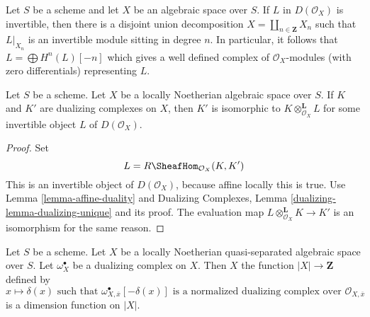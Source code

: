 \medskip\noindent
Let $S$ be a scheme and let $X$ be an algebraic space over $S$.
If $L$ in $D(\mathcal{O}_X)$ is invertible, then there is a
disjoint union decomposition $X = \coprod_{n \in \mathbf{Z}} X_n$
such that $L|_{X_n}$ is an invertible module sitting in degree $n$.
In particular, it follows that $L = \bigoplus H^n(L)[-n]$
which gives a well defined complex of $\mathcal{O}_X$-modules
(with zero differentials) representing $L$.

\begin{lemma}
\label{lemma-dualizing-unique-spaces}
Let $S$ be a scheme.
Let $X$ be a locally Noetherian algebraic space over $S$.
If $K$ and $K'$ are dualizing complexes on $X$, then $K'$
is isomorphic to $K \otimes_{\mathcal{O}_X}^\mathbf{L} L$
for some invertible object $L$ of $D(\mathcal{O}_X)$.
\end{lemma}

\begin{proof}
Set
$$
L = R\SheafHom_{\mathcal{O}_X}(K, K')
$$
This is an invertible object of $D(\mathcal{O}_X)$, because affine locally
this is true. Use Lemma \ref{lemma-affine-duality} and
Dualizing Complexes, Lemma
\ref{dualizing-lemma-dualizing-unique} and its proof.
The evaluation map $L \otimes_{\mathcal{O}_X}^\mathbf{L} K \to K'$
is an isomorphism for the same reason.
\end{proof}

\begin{lemma}
\label{lemma-dimension-function-scheme}
Let $S$ be a scheme. Let $X$ be a locally Noetherian
quasi-separated algebraic space over $S$.
Let $\omega_X^\bullet$ be a dualizing complex on $X$. Then $X$ the function
$|X| \to \mathbf{Z}$ defined by
$$
x \longmapsto \delta(x)\text{ such that }
\omega_{X, \overline{x}}^\bullet[-\delta(x)]
\text{ is a normalized dualizing complex over }
\mathcal{O}_{X, \overline{x}}
$$
is a dimension function on $|X|$.
\end{lemma}

